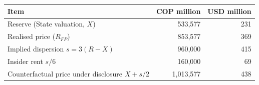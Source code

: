 \begin{tabular}{lrr}
\toprule
Item & COP million & USD million \\
\midrule
Reserve (State valuation, $X$) & 533,577 & 231 \\
Realised price ($R_{FP}$) & 853,577 & 369 \\
Implied dispersion $s=3(R-X)$ & 960,000 & 415 \\
Insider rent $s/6$ & 160,000 & 69 \\
Counterfactual price under disclosure $X+s/2$ & 1,013,577 & 438 \\
\bottomrule
\end{tabular}
